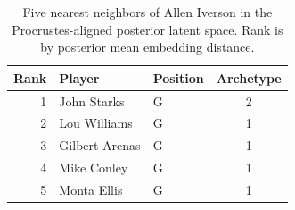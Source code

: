 \begin{table}[htbp]
  \centering\small
  \begin{tabular}{rllc}
    \toprule
    Rank & Player & Position & Archetype \\
    \midrule
    1 & John Starks & G & 2 \\
    2 & Lou Williams & G & 1 \\
    3 & Gilbert Arenas & G & 1 \\
    4 & Mike Conley & G & 1 \\
    5 & Monta Ellis & G & 1 \\
    \bottomrule
  \end{tabular}
  \caption{Five nearest neighbors of Allen Iverson in the Procrustes-aligned posterior latent space. Rank is by posterior mean embedding distance.}
  \label{tab:Allen_Iverson_neighbors}
\end{table}

